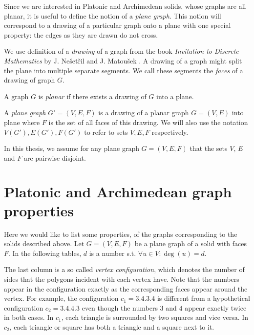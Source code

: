 Since we are interested in Platonic and Archimedean solids, whose graphs are all planar, it is useful to define the notion of a \textit{plane graph}. This notion will correspond to a drawing of a particular graph onto a plane with one special property: the edges as they are drawn do not cross. 

We use definition of a \textit{drawing} of a graph from the book \textit{Invitation to Discrete Mathematics} by J. Nešetřil and J. Matoušek \cite{matousek2009}. A drawing of a graph might split the plane into multiple separate segments. We call these segments the \textit{faces} of a drawing of graph $G$.

\begin{defn}
    A graph $G$ is \emph{planar} if there exists a drawing of $G$ into a plane.
\end{defn}

\begin{defn}
    A \emph{plane graph} $G' = (V,E,F)$ is a drawing of a planar graph $G=(V,E)$ into plane where $F$ is the set of all faces of this drawing. We will also use the notation $V(G'), E(G'), F(G')$ to refer to sets $V,E,F$ respectively.
\end{defn}

In this thesis, we assume for any plane graph $G=(V,E,F)$ that the sets $V$, $E$ and $F$ are pairwise disjoint.

\section{Platonic and Archimedean graph properties}

Here we would like to list some properties, of the graphs corresponding to the solids described above. Let $G=(V,E,F)$ be a plane graph of a solid with faces $F$. In the following tables, $d$ is a number s.t. $\forall u \in V : \deg(u) = d$. 

The last column is a so called \textit{vertex configuration}, which denotes the number of sides that the polygons incident with each vertex have. Note that the numbers appear in the configuration exactly as the corresponding faces appear around the vertex. For example, the configuration $c_1 = 3.4.3.4$ is different from a hypothetical configuration $c_2 = 3.4.4.3$ even though the numbers $3$ and $4$ appear exactly twice in both cases. In $c_1$, each triangle is surrounded by two squares and vice versa. In $c_2$, each triangle or square has both a triangle and a square next to it. 

